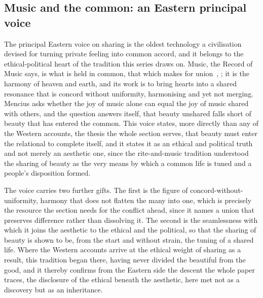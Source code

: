 \subsection{Music and the common: an Eastern principal voice}
\label{p22:sub:sharing-music}

The principal Eastern voice on sharing is the oldest technology a civilisation devised for turning private feeling into common accord, and it belongs to the ethical-political heart of the tradition this series draws on. Music, the Record of Music says, is what is held in common, that which makes for union~\parencite{yueji}, ; it is the harmony of heaven and earth, and its work is to bring hearts into a shared resonance that is concord without uniformity, harmonising and yet not merging. Mencius asks whether the joy of music alone can equal the joy of music shared with others, and the question answers itself, that beauty unshared falls short of beauty that has entered the common. This voice states, more directly than any of the Western accounts, the thesis the whole section serves, that beauty must enter the relational to complete itself, and it states it as an ethical and political truth and not merely an aesthetic one, since the rite-and-music tradition understood the sharing of beauty as the very means by which a common life is tuned and a people's disposition formed.

The voice carries two further gifts. The first is the figure of concord-without-uniformity, harmony that does not flatten the many into one, which is precisely the resource the section needs for the conflict ahead, since it names a union that preserves difference rather than dissolving it. The second is the seamlessness with which it joins the aesthetic to the ethical and the political, so that the sharing of beauty is shown to be, from the start and without strain, the tuning of a shared life. Where the Western accounts arrive at the ethical weight of sharing as a result, this tradition began there, having never divided the beautiful from the good, and it thereby confirms from the Eastern side the descent the whole paper traces, the disclosure of the ethical beneath the aesthetic, here met not as a discovery but as an inheritance.

